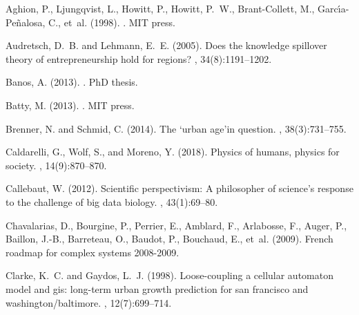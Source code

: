 \documentclass[10pt]{article}
\begin{document}
\begin{thebibliography}{}

Aghion, P., Ljungqvist, L., Howitt, P., Howitt, P.~W., Brant-Collett, M.,
  Garc{\'\i}a-Pe{\~n}alosa, C., et~al. (1998).
.
\newblock MIT press.

Audretsch, D.~B. and Lehmann, E.~E. (2005).
\newblock Does the knowledge spillover theory of entrepreneurship hold for
  regions?
, 34(8):1191--1202.

Banos, A. (2013).
.
\newblock PhD thesis.

Batty, M. (2013).
.
\newblock MIT press.

Brenner, N. and Schmid, C. (2014).
\newblock The ‘urban age’in question.
,
  38(3):731--755.

Caldarelli, G., Wolf, S., and Moreno, Y. (2018).
\newblock Physics of humans, physics for society.
, 14(9):870--870.

Callebaut, W. (2012).
\newblock Scientific perspectivism: A philosopher of science’s response to
  the challenge of big data biology.
, 43(1):69--80.

Chavalarias, D., Bourgine, P., Perrier, E., Amblard, F., Arlabosse, F., Auger,
  P., Baillon, J.-B., Barreteau, O., Baudot, P., Bouchaud, E., et~al. (2009).
\newblock French roadmap for complex systems 2008-2009.

Clarke, K.~C. and Gaydos, L.~J. (1998).
\newblock Loose-coupling a cellular automaton model and gis: long-term urban
  growth prediction for san francisco and washington/baltimore.
,
  12(7):699--714.


\end{thebibliography}
\end{document}
